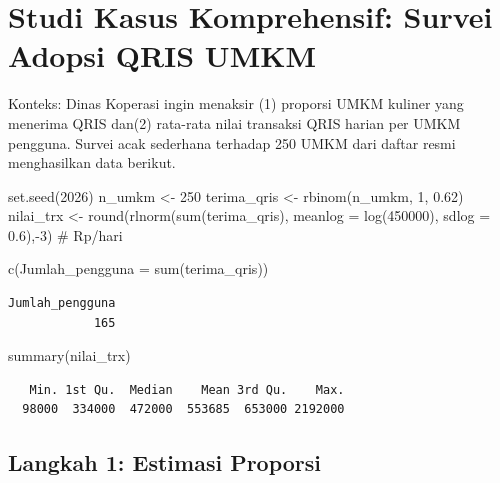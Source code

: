 \documentclass[
  indonesian,
  letterpaper,
]{book}
\newenvironment{Shaded}{\begin{snugshade}}{\end{snugshade}}
\newcommand{\AttributeTok}[1]{\textcolor[rgb]{0.40,0.45,0.13}{#1}}
\newcommand{\CommentTok}[1]{\textcolor[rgb]{0.37,0.37,0.37}{#1}}
\newcommand{\DecValTok}[1]{\textcolor[rgb]{0.68,0.00,0.00}{#1}}
\newcommand{\FloatTok}[1]{\textcolor[rgb]{0.68,0.00,0.00}{#1}}
\newcommand{\FunctionTok}[1]{\textcolor[rgb]{0.28,0.35,0.67}{#1}}
\newcommand{\NormalTok}[1]{\textcolor[rgb]{0.00,0.23,0.31}{#1}}
\newcommand{\OtherTok}[1]{\textcolor[rgb]{0.00,0.23,0.31}{#1}}
\newcommand{\SpecialCharTok}[1]{\textcolor[rgb]{0.37,0.37,0.37}{#1}}
\begin{document}
\section{Studi Kasus Komprehensif: Survei Adopsi QRIS
UMKM}\label{studi-kasus-komprehensif-survei-adopsi-qris-umkm}

Konteks: Dinas Koperasi ingin menaksir (1) proporsi UMKM kuliner yang
menerima QRIS dan(2) rata-rata nilai transaksi QRIS harian per UMKM
pengguna. Survei acak sederhana terhadap 250 UMKM dari daftar resmi
menghasilkan data berikut.

\begin{Shaded}
\begin{Highlighting}[]
\FunctionTok{set.seed}\NormalTok{(}\DecValTok{2026}\NormalTok{)}
\NormalTok{n\_umkm }\OtherTok{\textless{}{-}} \DecValTok{250}
\NormalTok{terima\_qris }\OtherTok{\textless{}{-}} \FunctionTok{rbinom}\NormalTok{(n\_umkm, }\DecValTok{1}\NormalTok{, }\FloatTok{0.62}\NormalTok{)}
\NormalTok{nilai\_trx }\OtherTok{\textless{}{-}} \FunctionTok{round}\NormalTok{(}\FunctionTok{rlnorm}\NormalTok{(}\FunctionTok{sum}\NormalTok{(terima\_qris), }\AttributeTok{meanlog =} \FunctionTok{log}\NormalTok{(}\DecValTok{450000}\NormalTok{), }\AttributeTok{sdlog =} \FloatTok{0.6}\NormalTok{),}\SpecialCharTok{{-}}\DecValTok{3}\NormalTok{) }\CommentTok{\# Rp/hari}

\FunctionTok{c}\NormalTok{(}\AttributeTok{Jumlah\_pengguna =} \FunctionTok{sum}\NormalTok{(terima\_qris))}
\end{Highlighting}
\end{Shaded}

\begin{verbatim}
Jumlah_pengguna 
            165 
\end{verbatim}

\begin{Shaded}
\begin{Highlighting}[]
\FunctionTok{summary}\NormalTok{(nilai\_trx)}
\end{Highlighting}
\end{Shaded}

\begin{verbatim}
   Min. 1st Qu.  Median    Mean 3rd Qu.    Max. 
  98000  334000  472000  553685  653000 2192000 
\end{verbatim}

\subsection{Langkah 1: Estimasi
Proporsi}\label{langkah-1-estimasi-proporsi}
\end{document}
